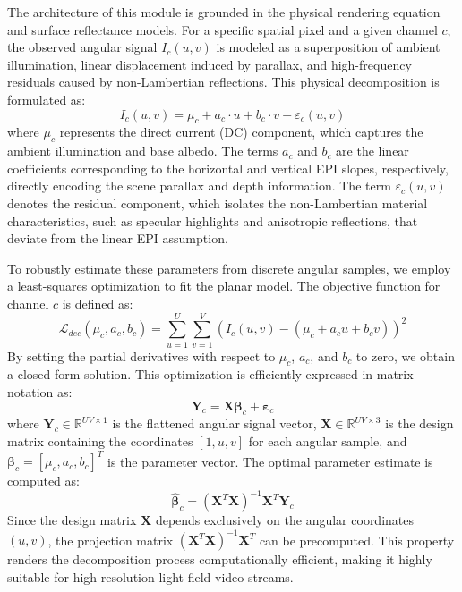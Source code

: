 The architecture of this module is grounded in the physical rendering equation and surface reflectance models. For a specific spatial pixel and a given channel $c$, the observed angular signal $I_c(u,v)$ is modeled as a superposition of ambient illumination, linear displacement induced by parallax, and high-frequency residuals caused by non-Lambertian reflections. This physical decomposition is formulated as:
\begin{equation}
\label{eq:eq4}
I_c(u,v) = \mu_c + a_c \cdot u + b_c \cdot v + \varepsilon_c(u,v)
\end{equation}
where $\mu_c$ represents the direct current (DC) component, which captures the ambient illumination and base albedo. The terms $a_c$ and $b_c$ are the linear coefficients corresponding to the horizontal and vertical EPI slopes, respectively, directly encoding the scene parallax and depth information. The term $\varepsilon_c(u,v)$ denotes the residual component, which isolates the non-Lambertian material characteristics, such as specular highlights and anisotropic reflections, that deviate from the linear EPI assumption.

To robustly estimate these parameters from discrete angular samples, we employ a least-squares optimization to fit the planar model. The objective function for channel $c$ is defined as:
\begin{equation}
\label{eq:eq5}
\mathcal{L}_{dec}(\mu_c, a_c, b_c) = \sum_{u=1}^{U} \sum_{v=1}^{V} \left( I_c(u,v) - (\mu_c + a_c u + b_c v) \right)^2
\end{equation}
By setting the partial derivatives with respect to $\mu_c$, $a_c$, and $b_c$ to zero, we obtain a closed-form solution. This optimization is efficiently expressed in matrix notation as:
\begin{equation}
\label{eq:eq6}
\mathbf{Y}_c = \mathbf{X} \boldsymbol{\beta}_c + \boldsymbol{\varepsilon}_c
\end{equation}
where $\mathbf{Y}_c \in \mathbb{R}^{UV \times 1}$ is the flattened angular signal vector, $\mathbf{X} \in \mathbb{R}^{UV \times 3}$ is the design matrix containing the coordinates $[1, u, v]$ for each angular sample, and $\boldsymbol{\beta}_c = [\mu_c, a_c, b_c]^T$ is the parameter vector. The optimal parameter estimate is computed as:
\begin{equation}
\label{eq:eq7}
\hat{\boldsymbol{\beta}}_c = (\mathbf{X}^T \mathbf{X})^{-1} \mathbf{X}^T \mathbf{Y}_c
\end{equation}
Since the design matrix $\mathbf{X}$ depends exclusively on the angular coordinates $(u,v)$, the projection matrix $(\mathbf{X}^T \mathbf{X})^{-1} \mathbf{X}^T$ can be precomputed. This property renders the decomposition process computationally efficient, making it highly suitable for high-resolution light field video streams.

